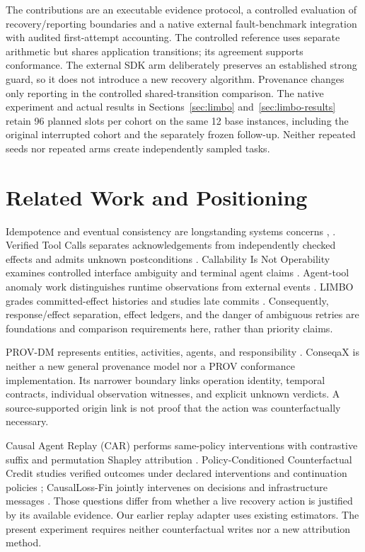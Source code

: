 \documentclass[conference]{IEEEtran}
\begin{document}
The contributions are an executable evidence protocol, a controlled evaluation of recovery/reporting boundaries and a native external fault-benchmark integration with audited first-attempt accounting. The controlled reference uses separate arithmetic but shares application transitions; its agreement supports conformance. The external SDK arm deliberately preserves an established strong guard, so it does not introduce a new recovery algorithm. Provenance changes only reporting in the controlled shared-transition comparison. The native experiment and actual results in Sections~\ref{sec:limbo} and~\ref{sec:limbo-results} retain 96 planned slots per cohort on the same 12 base instances, including the original interrupted cohort and the separately frozen follow-up. Neither repeated seeds nor repeated arms create independently sampled tasks.

\section{Related Work and Positioning}

Idempotence and eventual consistency are longstanding systems concerns \cite{helland}, \cite{vogels}. Verified Tool Calls separates acknowledgements from independently checked effects and admits unknown postconditions \cite{verified}. Callability Is Not Operability examines controlled interface ambiguity and terminal agent claims \cite{operability}. Agent-tool anomaly work distinguishes runtime observations from external events \cite{agenttool}. LIMBO grades committed-effect histories and studies late commits \cite{limbo}. Consequently, response/effect separation, effect ledgers, and the danger of ambiguous retries are foundations and comparison requirements here, rather than priority claims.

PROV-DM represents entities, activities, agents, and responsibility \cite{prov}. ConseqaX is neither a new general provenance model nor a PROV conformance implementation. Its narrower boundary links operation identity, temporal contracts, individual observation witnesses, and explicit unknown verdicts. A source-supported origin link is not proof that the action was counterfactually necessary.

Causal Agent Replay (CAR) performs same-policy interventions with contrastive suffix and permutation Shapley attribution \cite{car}. Policy-Conditioned Counterfactual Credit studies verified outcomes under declared interventions and continuation policies \cite{pccc}; CausalLoss-Fin jointly intervenes on decisions and infrastructure messages \cite{causalloss}. Those questions differ from whether a live recovery action is justified by its available evidence. Our earlier replay adapter uses existing estimators. The present experiment requires neither counterfactual writes nor a new attribution method.
\end{document}
